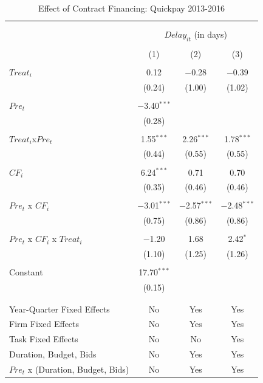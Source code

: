 \documentclass[
]{article}
\begin{document}
\begin{table}[H] \centering 
  \caption{Effect of Contract Financing: Quickpay 2013-2016} 
  \label{} 
\small 
\begin{tabular}{@{\extracolsep{-2pt}}lccc} 
\\[-1.8ex]\hline 
\hline \\[-1.8ex] 
\\[-1.8ex] & \multicolumn{3}{c}{$Delay_{it}$ (in days)} \\ 
\\[-1.8ex] & (1) & (2) & (3)\\ 
\hline \\[-1.8ex] 
 $Treat_i$ & 0.12 & $-$0.28 & $-$0.39 \\ 
  & (0.24) & (1.00) & (1.02) \\ 
  & & & \\ 
 $Pre_t$ & $-$3.40$^{***}$ &  &  \\ 
  & (0.28) &  &  \\ 
  & & & \\ 
 $Treat_i$x$Pre_t$ & 1.55$^{***}$ & 2.26$^{***}$ & 1.78$^{***}$ \\ 
  & (0.44) & (0.55) & (0.55) \\ 
  & & & \\ 
 $CF_i$ & 6.24$^{***}$ & 0.71 & 0.70 \\ 
  & (0.35) & (0.46) & (0.46) \\ 
  & & & \\ 
 $Pre_t$ x $CF_i$ & $-$3.01$^{***}$ & $-$2.57$^{***}$ & $-$2.48$^{***}$ \\ 
  & (0.75) & (0.86) & (0.86) \\ 
  & & & \\ 
 $Pre_t$ x $CF_i$ x $Treat_i$ & $-$1.20 & 1.68 & 2.42$^{*}$ \\ 
  & (1.10) & (1.25) & (1.26) \\ 
  & & & \\ 
 Constant & 17.70$^{***}$ &  &  \\ 
  & (0.15) &  &  \\ 
  & & & \\ 
\hline \\[-1.8ex] 
Year-Quarter Fixed Effects & No & Yes & Yes \\ 
Firm Fixed Effects & No & Yes & Yes \\ 
Task Fixed Effects & No & No & Yes \\ 
Duration, Budget, Bids & No & Yes & Yes \\ 
$Pre_t$  x  (Duration, Budget, Bids) & No & Yes & Yes \\ 

\end{tabular}
\end{table}
\end{document}
